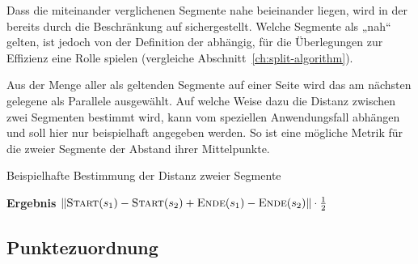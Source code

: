 \documentclass[../main/thesis.tex]{subfiles}
\begin{document}
Dass die miteinander verglichenen Segmente nahe beieinander liegen, wird in der  bereits durch die Beschränkung auf  sichergestellt.
Welche Segmente als „nah“ gelten, ist jedoch von der Definition der  abhängig, für die Überlegungen zur Effizienz eine Rolle spielen (vergleiche Abschnitt~\ref{ch:split-algorithm}).


Aus der Menge aller als  geltenden Segmente auf einer Seite wird das am nächsten gelegene als Parallele ausgewählt.
Auf welche Weise dazu die Distanz zwischen zwei Segmenten bestimmt wird, kann vom speziellen Anwendungsfall abhängen und soll hier nur beispielhaft angegeben werden.
So ist eine mögliche Metrik für die  zweier Segmente der Abstand ihrer Mittelpunkte.


\begin{algorithmhere}{Beispielhafte Bestimmung der Distanz zweier Segmente}
\label{alg:Distanz}
\begin{algorithmic}
	\State \textbf{Ergebnis} $\abs\textproc{Start}(s_1) - \textproc{Start}(s_2) + \textproc{Ende}(s_1) - \textproc{Ende}(s_2)\abs \cdot \frac{1}{2}$
\EndFunction
\end{algorithmic}
\end{algorithmhere}




\subsection{Punktezuordnung}
\label{ch:node-match-algorithm}
\end{document}
